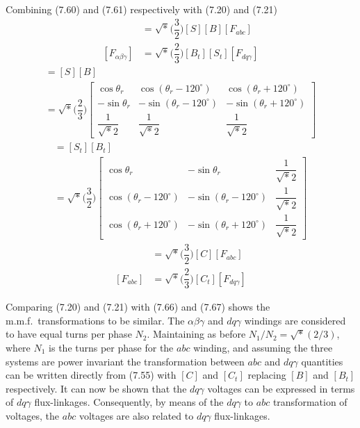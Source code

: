 \documentclass[a4paper,numbers=noenddot,12pt]{scrbook}
\begin{document}
        Combining (7.60) and (7.61) respectively with (7.20) and (7.21)
        \begin{align}
            [F_{d q \gamma}] & = \sqrt*{\Big( \dfrac{3}{2} \Big)} [S] [B] [F_{abc}]\\ 
            [F_{\alpha \beta \gamma}] & = \sqrt*{\Big( \dfrac{2}{3} \Big)} [B_t] [S_t] [F_{d q \gamma}]
            \label{eq:Eq7.63}
        \end{align}
        \begin{multline}
            [C] = [S] [B] \\
            =  \sqrt*{\Big( \dfrac{2}{3} \Big)}
            \begin{bmatrix}
                \cos \theta_r & \cos (\theta_r - 120^{\circ}) & \cos (\theta_r + 120^{\circ}) \\
                - \sin \theta_r & - \sin (\theta_r - 120^{\circ}) & - \sin (\theta_r + 120^{\circ}) \\
                \dfrac{1}{\sqrt*{2}} & \dfrac{1}{\sqrt*{2}} & \dfrac{1}{\sqrt*{2}}
            \end{bmatrix}
            \label{eq:7.64}
        \end{multline}
        \begin{multline}
            [C_t] = [S_t] [B_t] \\
            =  \sqrt*{\Big( \dfrac{3}{2} \Big)}
            \begin{bmatrix}
                \cos \theta_r & -\sin \theta_r & \dfrac{1}{\sqrt*{2}} \\[2ex]
                \cos (\theta_r - 120^{\circ}) & - \sin (\theta_r - 120^{\circ}) & \dfrac{1}{\sqrt*{2}} \\[2ex]
                \cos (\theta_r + 120^{\circ}) & - \sin (\theta_r + 120^{\circ}) & \dfrac{1}{\sqrt*{2}}
            \end{bmatrix}
            \label{eq:Eq.7.65}
        \end{multline}
        \begin{align}
            [F_{d q \gamma}] & = \sqrt*{\Big( \dfrac{3}{2} \Big)} [C] [F_{abc}] \\
            [F_{abc}] & = \sqrt*{\Big( \dfrac{2}{3} \Big)} [C_t] [F_{d q \gamma }]
            \label{eq:Eq7.67}
        \end{align}

        Comparing (7.20) and (7.21) with (7.66) and (7.67) shows the m.m.f.\ transformations to be similar. The $\alpha \beta \gamma$ and $d q \gamma$ windings are considered to have equal turns per phase $N_2$. Maintaining as before $N_1/N_2 = \sqrt*{(2/3)}$, where $N_1$ is the turns per phase for the $abc$ winding, and assuming the three systems are power invariant the transformation between $abc$ and $d q \gamma$ quantities can be written directly from (7.55) with $[C]$ and $[C_t]$ replacing
        $[B]$ and $[B_t]$ respectively.
        It can now be shown that the $dq\gamma$ voltages can be expressed in terms of $dq\gamma$ flux-linkages. Consequently, by means of the $dq\gamma$ to $abc$ transformation of voltages, the $abc$ voltages are also related to $dq\gamma$ flux-linkages.
\end{document}
